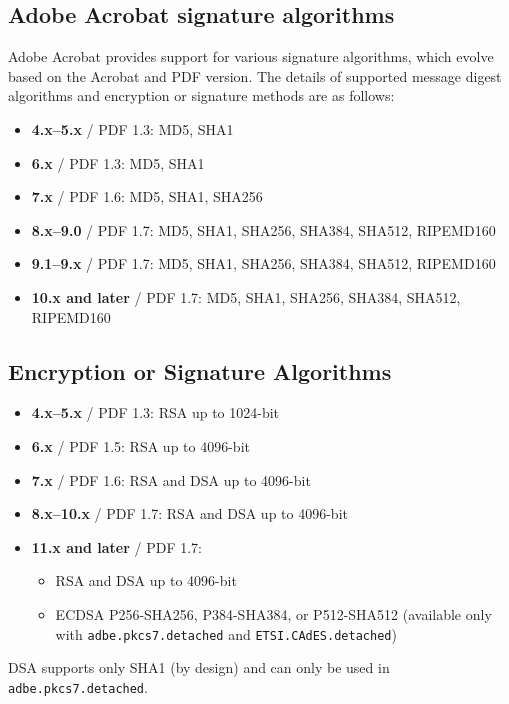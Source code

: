 \subsection{Adobe Acrobat signature algorithms}
Adobe Acrobat provides support for various signature algorithms, which
evolve based on the Acrobat and PDF version. The details of supported
message digest algorithms and encryption or signature methods are as
follows:

\begin{itemize}
    \item \textbf{4.x–5.x} / PDF 1.3: MD5, SHA1
    \item \textbf{6.x} / PDF 1.3: MD5, SHA1
    \item \textbf{7.x} / PDF 1.6: MD5, SHA1, SHA256
    \item \textbf{8.x–9.0} / PDF 1.7: MD5, SHA1, SHA256, SHA384,
      SHA512, RIPEMD160
    \item \textbf{9.1–9.x} / PDF 1.7: MD5, SHA1, SHA256, SHA384,
      SHA512, RIPEMD160
    \item \textbf{10.x and later} / PDF 1.7: MD5, SHA1, SHA256,
      SHA384, SHA512, RIPEMD160
\end{itemize}

\subsection*{Encryption or Signature Algorithms}
\begin{itemize}
    \item \textbf{4.x–5.x} / PDF 1.3: RSA up to 1024-bit
    \item \textbf{6.x} / PDF 1.5: RSA up to 4096-bit
    \item \textbf{7.x} / PDF 1.6: RSA and DSA up to 4096-bit
    \item \textbf{8.x–10.x} / PDF 1.7: RSA and DSA up to 4096-bit
    \item \textbf{11.x and later} / PDF 1.7:
    \begin{itemize}
        \item RSA and DSA up to 4096-bit
        \item ECDSA P256-SHA256, P384-SHA384, or P512-SHA512
          (available only with \texttt{adbe.pkcs7.detached} and
          \texttt{ETSI.CAdES.detached})
    \end{itemize}
\end{itemize}

DSA supports only SHA1 (by design) and can only be used in
\texttt{adbe.pkcs7.detached}.

